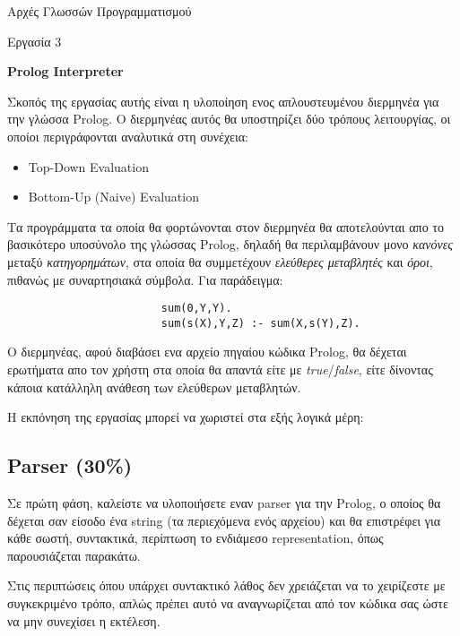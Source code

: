 \documentclass[10pt]{article}
\begin{document}
\begin{center}
    \huge{Αρχές Γλωσσών Προγραμματισμού}

    \LARGE{Εργασία 3}

    \textbf{\Large{Prolog Interpreter}}
\end{center}

\vspace{0.5cm}

Σκοπός της εργασίας αυτής είναι η υλοποίηση ενος απλουστευμένου διερμηνέα για την γλώσσα Prolog. Ο διερμηνέας αυτός θα υποστηρίζει δύο τρόπους λειτουργίας, οι οποίοι περιγράφονται αναλυτικά στη συνέχεια:


\begin{itemize}
    \item Top-Down Evaluation
    \item Bottom-Up (Naive) Evaluation
\end{itemize}


Τα προγράμματα τα οποία θα φορτώνονται στον διερμηνέα θα αποτελούνται απο το βασικότερο υποσύνολο της γλώσσας Prolog, δηλαδή θα περιλαμβάνουν μονο \textit{κανόνες} μεταξύ \textit{κατηγορημάτων}, στα οποία θα συμμετέχουν \textit{ελεύθερες μεταβλητές} και \textit{όροι}, πιθανώς με συναρτησιακά σύμβολα. Για παράδειγμα: 



\begin{verbatim}
                        sum(0,Y,Y).
                        sum(s(X),Y,Z) :- sum(X,s(Y),Z).
\end{verbatim}



Ο διερμηνέας, αφού διαβάσει ενα αρχείο πηγαίου κώδικα Prolog, θα δέχεται ερωτήματα απο τον χρήστη στα οποία θα απαντά είτε με \textit{true}/\textit{false}, είτε δίνοντας κάποια κατάλληλη ανάθεση των ελεύθερων μεταβλητών.\

Η εκπόνηση της εργασίας μπορεί να χωριστεί στα εξής λογικά μέρη:

\subsection*{Parser (30\%)}

Σε πρώτη φάση, καλείστε να υλοποιήσετε εναν parser για την Prolog, ο οποίος θα δέχεται σαν είσοδο ένα string (τα περιεχόμενα ενός αρχείου) και θα επιστρέφει για κάθε σωστή, συντακτικά, περίπτωση το ενδιάμεσο representation, όπως παρουσιάζεται παρακάτω.\

Στις περιπτώσεις όπου υπάρχει συντακτικό λάθος δεν χρειάζεται να το χειρίζεστε με συγκεκριμένο τρόπο, απλώς πρέπει αυτό να αναγνωρίζεται από τον κώδικα σας ώστε να μην συνεχίσει η εκτέλεση.\ 
\end{document}
